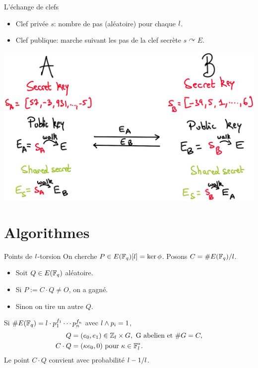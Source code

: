 \documentclass{beamer}
\begin{document}
\begin{frame}{L'\'echange de clefs}
	\begin{itemize}
		\item Clef priv\'ee $s$: nombre de pas (al\'eatoire) pour chaque $\mathnormal{l}$.
		\item Clef publique: marche suivant les pas de la clef secr\`ete $s\curvearrowright E$.
	\end{itemize}
\begin{center}
	\includegraphics[scale=0.2]{../figs/DH}
\end{center}
\end{frame}

\section{Algorithmes}
\begin{frame}{Points de $\mathnormal{l}$-torsion}
	On cherche $P\in E(\mathbb{F}_q)[\mathnormal{l}] = \ker\phi$. Posons $C = \#E(\mathbb{F}_q) / \mathnormal{l}$.
	\begin{itemize}
		\item Soit $Q\in E(\mathbb{F}_q)$ al\'eatoire.
		\item Si $P := C\cdot Q \neq O$, on a gagn\'e.
		\item Sinon on tire un autre $Q$.
	\end{itemize}
	Si $\#E(\mathbb{F}_q) = \mathnormal{l} \cdot p_1 ^{f_1}\cdots p_n^{f_n}$ avec $\mathnormal{l}\wedge p_i = 1$,
	\begin{align*}
		Q &= (e_0, e_1)\in \mathbb{Z}_{\mathnormal{l}}\times G, \text{ G abelien et }\#G = C, \\
		C\cdot Q &= (\kappa e_0, 0) \text{ pour } \kappa\in \mathbb{F}_{\mathnormal{l}}^{*}.
	\end{align*}
	Le point $C\cdot Q$ convient avec probabilit\'e $\mathnormal{l}-1/\mathnormal{l}$.
\end{frame}
\end{document}
